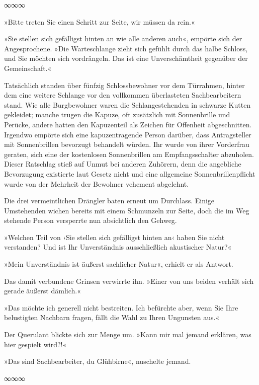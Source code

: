 \begin{center}
∞∞∞
\end{center}

»Bitte treten Sie einen Schritt zur Seite, wir müssen da rein.«

»Sie stellen sich gefälligst hinten an wie alle anderen auch«, empörte sich der Angesprochene. »Die Warteschlange zieht sich gefühlt durch das halbe Schloss, und Sie möchten sich vordrängeln. Das ist eine Unverschämtheit gegenüber der Gemeinschaft.«

Tatsächlich standen über fünfzig Schlossbewohner vor dem Türrahmen, hinter dem eine weitere Schlange vor den vollkommen überlasteten Sachbearbeitern stand. Wie alle Burgbewohner waren die Schlangestehenden in schwarze Kutten gekleidet; manche trugen die Kapuze, oft zusätzlich mit Sonnenbrille und Perücke, andere hatten den Kapuzenteil als Zeichen für Offenheit abgeschnitten. Irgendwo empörte sich eine kapuzentragende Person darüber, dass Antragsteller mit Sonnenbrillen bevorzugt behandelt würden. Ihr wurde von ihrer Vorderfrau geraten, sich eine der kostenlosen Sonnenbrillen am Empfangsschalter abzuholen. Dieser Ratschlag stieß auf Unmut bei anderen Zuhörern, denn die angebliche Bevorzugung existierte laut Gesetz nicht und eine allgemeine Sonnenbrillenpflicht wurde von der Mehrheit der Bewohner vehement abgelehnt.

Die drei vermeintlichen Drängler baten erneut um Durchlass. Einige Umstehenden wichen bereits mit einem Schmunzeln zur Seite, doch die im Weg stehende Person versperrte nun absichtlich den Gehweg.

»Welchen Teil von ›Sie stellen sich gefälligst hinten an‹ haben Sie nicht verstanden? Und ist Ihr Unverständnis ausschließlich akustischer Natur?«

»Mein Unverständnis ist äußerst sachlicher Natur«, erhielt er als Antwort.

Das damit verbundene Grinsen verwirrte ihn. »Einer von uns beiden verhält sich gerade äußerst dämlich.«

»Das möchte ich generell nicht bestreiten. Ich befürchte aber, wenn Sie Ihre belustigten Nachbarn fragen, fällt die Wahl zu Ihren Ungunsten aus.«

Der Querulant blickte sich zur Menge um. »Kann mir mal jemand erklären, was hier gespielt wird?!«

»Das sind Sachbearbeiter, du Glühbirne«, nuschelte jemand.

\begin{center}
∞∞∞
\end{center}

